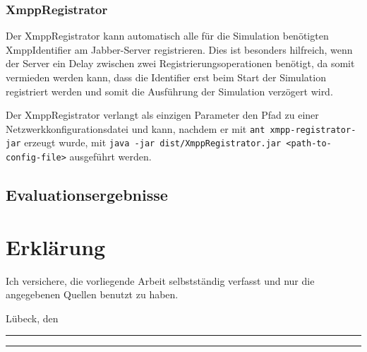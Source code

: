 \subsection{XmppRegistrator}
Der XmppRegistrator kann automatisch alle für die Simulation benötigten XmppIdentifier am Jabber-Server registrieren. Dies ist besonders hilfreich, wenn der Server ein Delay zwischen zwei Registrierungsoperationen benötigt, da somit vermieden werden kann, dass die Identifier erst beim Start der Simulation registriert werden und somit die Ausführung der Simulation verzögert wird.

Der XmppRegistrator verlangt als einzigen Parameter den Pfad zu einer Netzwerkkonfigurationsdatei und kann, nachdem er mit \texttt{ant xmpp-registrator-jar} erzeugt wurde, mit \texttt{java -jar dist/XmppRegistrator.jar <path-to-config-file>} ausgeführt werden.

\section{Evaluationsergebnisse}\label{sec:appendix_C}

\chapter*{Erklärung}
\thispagestyle{empty}
Ich versichere, die vorliegende Arbeit selbstständig verfasst und nur die
angegebenen Quellen benutzt zu haben.


\vspace*{5cm}
Lübeck, den \rule{0.3\textwidth}{0.4pt} \hspace*{1cm} \rule{0.3\textwidth}{0.4pt}